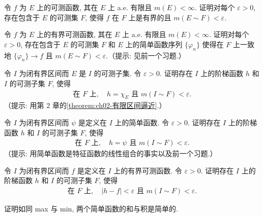 \documentclass[../../main.tex]{subfiles}
\begin{document}
\begin{exercise}\label{exercise:ch03-14}
令 $f$ 为 $E$ 上的可测函数, 其在 $E$ 上 a.e. 有限且 $m(E)<\infty$. 证明对每个 $\varepsilon>0$, 存在包含于 $E$ 的可测集 $F$, 使得 $f$ 在 $F$ 上是有界的且 $m(E\sim F)<\varepsilon$.
\end{exercise}

\begin{exercise}\label{exercise:ch03-15}
令 $f$ 为 $E$ 上的有界可测函数, 其在 $E$ 上 a.e. 有限且 $m(E)<\infty$. 证明对每个 $\varepsilon>0$, 存在包含于 $E$ 的可测集 $F$ 和 $E$ 上的简单函数序列 $\{\varphi_{n}\}$ 使得在 $F$ 上一致地 $\{\varphi_{n}\}\to f$ 且 $m(E\sim F)<\varepsilon$.（提示: 见前一个习题.）
\end{exercise}

\begin{exercise}\label{exercise:ch03-16}
令 $I$ 为闭有界区间而 $E$ 是 $I$ 的可测子集. 令 $\varepsilon>0$. 证明存在 $I$ 上的阶梯函数 $h$ 和 $I$ 的可测子集 $F$, 使得
\begin{align*}
\text{在 }F\text{ 上},\quad h=\chi_{E}\text{ 且 }m(I\sim F)<\varepsilon.
\end{align*}
（提示: 用第 2 章的\cref{theorem:ch02-有限区间逼近}.）
\end{exercise}

\begin{exercise}\label{exercise:ch03-17}
令 $I$ 为闭有界区间而 $\psi$ 是定义在 $I$ 上的简单函数. 令 $\varepsilon>0$. 证明存在 $I$ 上的阶梯函数 $h$ 和 $I$ 的可测子集 $F$, 使得
\begin{align*}
\text{在 }F\text{ 上},\quad h=\psi\text{ 且 }m(I\sim F)<\varepsilon.
\end{align*}
（提示: 用简单函数是特征函数的线性组合的事实以及前一个习题.）
\end{exercise}

\begin{exercise}\label{exercise:ch03-18}
令 $I$ 为闭有界区间而 $f$ 是定义在 $I$ 上的有界可测函数. 令 $\varepsilon>0$. 证明存在 $I$ 上的阶梯函数 $h$ 和 $I$ 的可测子集 $F$, 使得
\begin{align*}
\text{在 }F\text{ 上},\quad|h-f|<\varepsilon\text{ 且 }m(I\sim F)<\varepsilon.
\end{align*}
\end{exercise}

\begin{exercise}\label{exercise:ch03-19}
证明如同 max 与 min, 两个简单函数的和与积是简单的.
\end{exercise}
\end{document}
